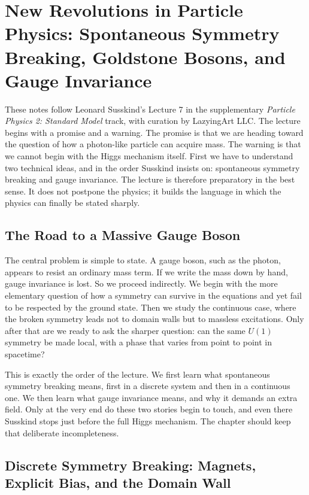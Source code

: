 \chapter{New Revolutions in Particle Physics: Spontaneous Symmetry Breaking, Goldstone Bosons, and Gauge Invariance}

These notes follow Leonard Susskind's Lecture 7 in the supplementary \emph{Particle Physics 2: Standard Model} track, with curation by LazyingArt LLC. The lecture begins with a promise and a warning. The promise is that we are heading toward the question of how a photon-like particle can acquire mass. The warning is that we cannot begin with the Higgs mechanism itself. First we have to understand two technical ideas, and in the order Susskind insists on: spontaneous symmetry breaking and gauge invariance. The lecture is therefore preparatory in the best sense. It does not postpone the physics; it builds the language in which the physics can finally be stated sharply.

\section{The Road to a Massive Gauge Boson}

The central problem is simple to state. A gauge boson, such as the photon, appears to resist an ordinary mass term. If we write the mass down by hand, gauge invariance is lost. So we proceed indirectly. We begin with the more elementary question of how a symmetry can survive in the equations and yet fail to be respected by the ground state. Then we study the continuous case, where the broken symmetry leads not to domain walls but to massless excitations. Only after that are we ready to ask the sharper question: can the same \(U(1)\) symmetry be made local, with a phase that varies from point to point in spacetime?

This is exactly the order of the lecture. We first learn what spontaneous symmetry breaking means, first in a discrete system and then in a continuous one. We then learn what gauge invariance means, and why it demands an extra field. Only at the very end do these two stories begin to touch, and even there Susskind stops just before the full Higgs mechanism. The chapter should keep that deliberate incompleteness.

\section{Discrete Symmetry Breaking: Magnets, Explicit Bias, and the Domain Wall}


